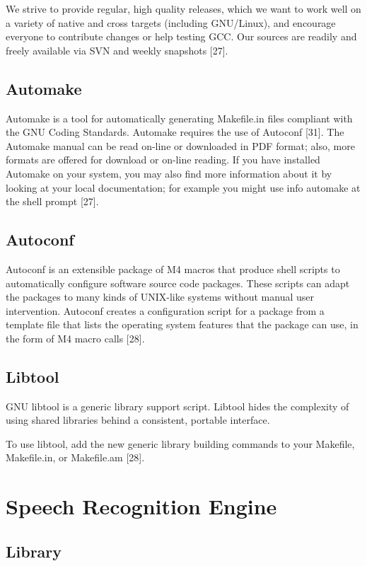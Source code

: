 \documentclass[12pt,a4paper,oneside]{memoir}
\begin{document}
We strive to provide regular, high quality releases, which we want to work well on a variety of native and cross targets (including GNU/Linux), and encourage everyone to contribute changes or help testing GCC. Our sources are readily and freely available via SVN and weekly snapshots [27].

\subsection{Automake} 
Automake is a tool for automatically generating Makefile.in files compliant with the GNU Coding Standards. Automake requires the use of Autoconf [31]. The Automake manual can be read on-line or downloaded in PDF format; also, more formats are offered for download or on-line reading. If you have installed Automake on your system, you may also find more information about it by looking at your local documentation; for example you might use info automake at the shell prompt [27]. 
 
\subsection{Autoconf}
Autoconf is an extensible package of M4 macros that produce shell scripts to automatically configure software source code packages. These scripts can adapt the packages to many kinds of UNIX-like systems without manual user intervention. Autoconf creates a configuration script for a package from a template file that lists the operating system features that the package can use, in the form of M4 macro calls [28].

\subsection{Libtool}
 GNU libtool is a generic library support script. Libtool hides the complexity of using shared libraries behind a consistent, portable interface.

To use libtool, add the new generic library building commands to your Makefile, Makefile.in, or Makefile.am [28].




\section{Speech Recognition Engine}
\subsection{Library}
\end{document}
